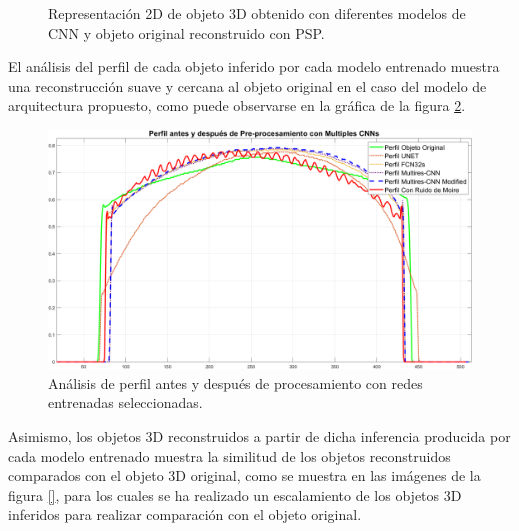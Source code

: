 \documentclass[10pt,letterpaper]{article}
\begin{document}
\begin{figure}[H]
\begin{center}
{            \label{tif116}}
        \caption{Representación 2D de objeto 3D obtenido con diferentes modelos de CNN y objeto original reconstruido con PSP.}
        \label{tif141142143144116117}
      \end{center}
\end{figure}

El análisis del perfil de cada objeto inferido por cada modelo entrenado muestra una reconstrucción suave y cercana al objeto original en el caso del modelo de arquitectura propuesto, como puede observarse en la gráfica de la figura \ref{tif145}.


\begin{figure}[H]
	\centering
    \includegraphics[width=1\textwidth]{tifs/tif145.png}
    \caption{Análisis de perfil antes y después de procesamiento con redes entrenadas seleccionadas.}
    \label{tif145}
\end{figure}

Asimismo, los objetos 3D reconstruidos a partir de dicha inferencia producida por cada modelo entrenado muestra la similitud de los objetos reconstruidos comparados con el objeto 3D original, como se muestra en las imágenes de la figura \ref{}, para los cuales se ha realizado un escalamiento\cite{Alfa:Mont} de los objetos 3D inferidos para realizar comparación con el objeto original.
\end{document}
